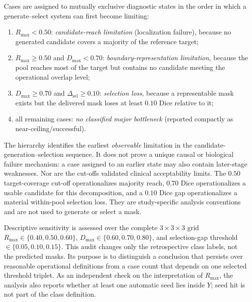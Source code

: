 \documentclass[11pt,a4paper]{article}
\begin{document}
Cases are assigned to mutually exclusive diagnostic states in the order in
which a generate--select system can first become limiting:
\begin{enumerate}[label=(\roman*),leftmargin=2.3em,itemsep=0.15em,topsep=0.3em]
 \item $R_{\max}<0.50$: \emph{candidate-reach limitation} (localization failure),
 because no generated candidate covers a majority of the reference target;
 \item $R_{\max}\ge0.50$ and $D_{\max}<0.70$:
 \emph{boundary-representation limitation}, because the pool reaches most of
 the target but contains no candidate meeting the operational overlap level;
 \item $D_{\max}\ge0.70$ and $\Delta_{\mathrm{sel}}\ge0.10$:
 \emph{selection loss}, because a representable mask exists but the delivered
 mask loses at least $0.10$ Dice relative to it;
 \item all remaining cases: \emph{no classified major bottleneck} (reported
 compactly as near-ceiling/successful).
\end{enumerate}
The hierarchy identifies the earliest \emph{observable} limitation in the
candidate-generation--selection sequence. It does not prove a unique causal or
biological failure mechanism: a case assigned to an earlier state may also
contain later-stage weaknesses. Nor are the cut-offs validated clinical
acceptability limits. The $0.50$ target-coverage cut-off operationalizes majority
reach, $0.70$ Dice operationalizes a usable candidate for this decomposition,
and a $0.10$ Dice gap operationalizes a material within-pool selection loss.
They are study-specific analysis conventions and are not used to generate or
select a mask.

Descriptive sensitivity is assessed over the complete $3\times3\times3$ grid
$R_{\max}\in\{0.40,0.50,0.60\}$, $D_{\max}\in\{0.60,0.70,0.80\}$, and
selection-gap threshold $\in\{0.05,0.10,0.15\}$. This audit changes only the
retrospective class labels, not the predicted masks. Its purpose is to distinguish
a conclusion that persists over reasonable operational definitions from a case
count that depends on one selected threshold triplet. As an independent check on
the interpretation of $R_{\max}$, the analysis also reports whether at least one
automatic seed lies inside $Y$; seed hit is not part of the class definition.
\end{document}
